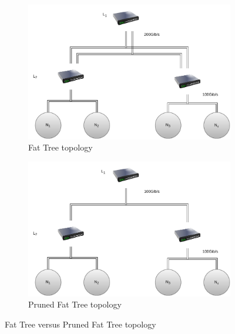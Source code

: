\begin{figure}
     \centering
     \begin{subfigure}[b]{0.45\textwidth}
         \centering
         \includegraphics[width=\textwidth, height=\textwidth]{figures/fatTree.pdf}
         \caption{Fat Tree topology}
         \label{fig:fat}
     \end{subfigure}
     \hfill
     \begin{subfigure}[b]{0.45\textwidth}
         \centering
         \includegraphics[width=\textwidth, height=\textwidth]{figures/PrunedFat.pdf}
         \caption{Pruned Fat Tree topology}
         \label{fig:prunedfat}
     \end{subfigure}
        \caption{Fat Tree versus Pruned Fat Tree topology}
        \label{fig:fatTreeTopo}
\end{figure}

